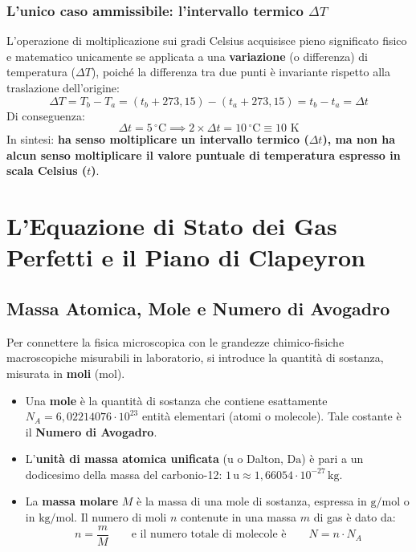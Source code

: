\documentclass[11pt,a4paper,oneside]{report}
\begin{document}
\begin{approfondimento}
\subsection*{L'unico caso ammissibile: l'intervallo termico $\Delta T$}
L'operazione di moltiplicazione sui gradi Celsius acquisisce pieno significato fisico e matematico unicamente se applicata a una \textbf{variazione} (o differenza) di temperatura ($\Delta T$), poich\'e la differenza tra due punti \`e invariante rispetto alla traslazione dell'origine:
\[
\Delta T = T_b - T_a = (t_b + 273{,}15) - (t_a + 273{,}15) = t_b - t_a = \Delta t
\]
Di conseguenza:
\[
\Delta t = 5\,{^\circ}\text{C} \implies 2 \times \Delta t = 10\,{^\circ}\text{C} \equiv 10\text{ K}
\]
In sintesi: \textbf{ha senso moltiplicare un intervallo termico ($\Delta t$), ma non ha alcun senso moltiplicare il valore puntuale di temperatura espresso in scala Celsius ($t$)}.
\end{approfondimento}

\chapter{L'Equazione di Stato dei Gas Perfetti e il Piano di Clapeyron}

\section{Massa Atomica, Mole e Numero di Avogadro}
Per connettere la fisica microscopica con le grandezze chimico-fisiche macroscopiche misurabili in laboratorio, si introduce la quantità di sostanza, misurata in \textbf{moli} ($\text{mol}$).
\begin{itemize}
  \item Una \textbf{mole} è la quantità di sostanza che contiene esattamente $N_A = 6{,}02214076 \cdot 10^{23}$ entità elementari (atomi o molecole). Tale costante è il \textbf{Numero di Avogadro}.
  \item L'\textbf{unità di massa atomica unificata} ($\text{u}$ o Dalton, $\text{Da}$) è pari a un dodicesimo della massa del carbonio-12: $1\,\text{u} \approx 1{,}66054 \cdot 10^{-27}\,\text{kg}$.
  \item La \textbf{massa molare} $M$ è la massa di una mole di sostanza, espressa in $\text{g/mol}$ o in $\text{kg/mol}$. Il numero di moli $n$ contenute in una massa $m$ di gas è dato da:
  \[
  n = \frac{m}{M} \qquad \text{e il numero totale di molecole è} \qquad N = n \cdot N_A
  \]
\end{itemize}
\end{document}
